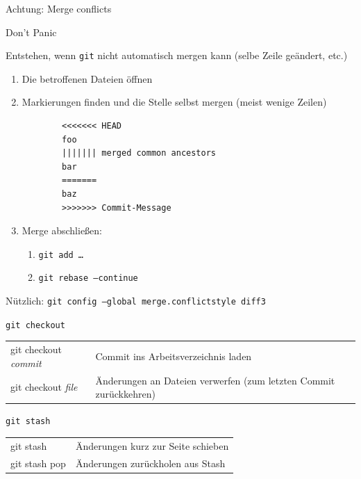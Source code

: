 \begin{frame}[fragile]{Achtung: Merge conflicts}
  \begin{center}
    \huge Don't Panic
  \end{center}

  Entstehen, wenn \texttt{git} nicht automatisch mergen kann (selbe Zeile geändert, etc.)

  \begin{enumerate}
    \item Die betroffenen Dateien öffnen
    \item Markierungen finden und die Stelle selbst mergen (meist wenige Zeilen)
      \begin{verbatim}
        <<<<<<< HEAD
        foo
        ||||||| merged common ancestors
        bar
        =======
        baz
        >>>>>>> Commit-Message
\end{verbatim}
    \item Merge abschließen:
      \begin{enumerate}
        \item \texttt{git add …}
        \item \texttt{git rebase --continue}
      \end{enumerate}
  \end{enumerate}
  Nützlich: \texttt{git config --global merge.conflictstyle diff3}
\end{frame}

\begin{frame}{\texttt{git checkout}}
  \begin{tabu}{>{\ttfamily}l X[,L]}
    git checkout \textit{commit} & Commit ins Arbeitsverzeichnis laden \\
    git checkout \textit{file}   & Änderungen an Dateien verwerfen (zum letzten Commit zurückkehren)
  \end{tabu}
\end{frame}

\begin{frame}{\texttt{git stash}}
  \begin{tabu}{>{\ttfamily}l X[,L]}
    git stash     & Änderungen kurz zur Seite schieben \\
    git stash pop & Änderungen zurückholen aus Stash
  \end{tabu}
\end{frame}

